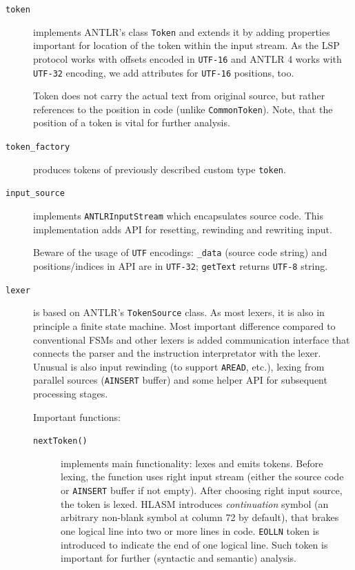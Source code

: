 \begin{description}
	
		\item[\texttt{token}] implements ANTLR's class \texttt{Token} and extends it by adding properties important for location of the token within the input stream. As the LSP protocol works with offsets encoded in \texttt{UTF-16} and ANTLR 4 works with \texttt{UTF-32} encoding, we add attributes for \texttt{UTF-16} positions, too.
		
		Token does not carry the actual text from original source, but rather references to the position in code (unlike \texttt{CommonToken}). Note, that the position of a token is vital for further analysis.
		
		
		\item[\texttt{token\_factory}] produces tokens of previously described custom type \texttt{token}.
		
		\item[\texttt{input\_source}] implements \texttt{ANTLRInputStream} which encapsulates source code. This implementation adds API for resetting, rewinding and rewriting input. 
		
		Beware of the usage of \texttt{UTF} encodings: \texttt{\_data} (source code string) and positions/indices in API are in \texttt{UTF-32}; \texttt{getText} returns \texttt{UTF-8} string.
		
		\item[\texttt{lexer}] is based on ANTLR's \texttt{TokenSource} class. As most lexers, it is also in principle a finite state machine. Most important difference compared to conventional FSMs and other lexers is added communication interface that connects the parser and the instruction interpretator with the lexer. Unusual is also input rewinding (to support \texttt{AREAD}, etc.), lexing from parallel sources (\texttt{AINSERT} buffer) and some helper API for subsequent processing stages.
		
		Important functions:
		
		\begin{description}
			\item[\texttt{nextToken()}] implements main functionality: lexes and emits tokens. Before lexing, the function uses right input stream (either the source code or \texttt{AINSERT} buffer if not empty). After choosing right input source, the token is lexed. HLASM introduces \textit{continuation} symbol (an arbitrary non-blank symbol at column 72 by default), that brakes one logical line into two or more lines in code. \texttt{EOLLN} token is introduced to indicate the end of one logical line. Such token is important for further (syntactic and semantic) analysis.
			

\end{description}
\end{description}
